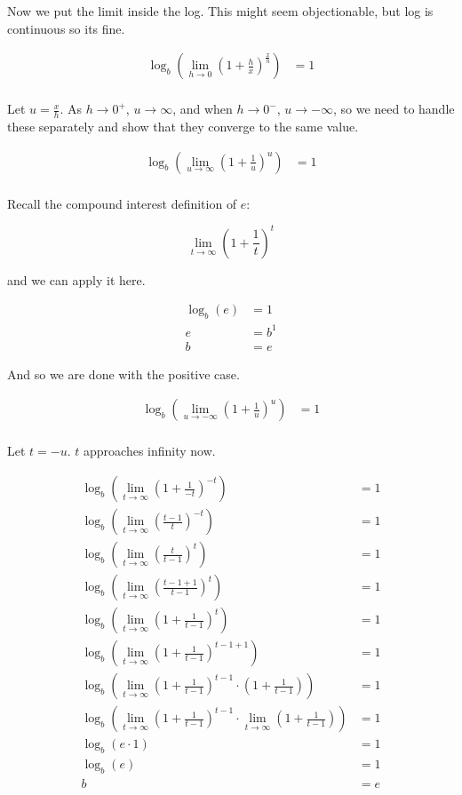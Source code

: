 Now we put the limit inside the log. This might seem objectionable, but log is continuous so its fine.

\begin{align}
\log_b({\lim_{h \to 0} (1 + \frac{h}{x})^{\frac{x}{h}}}) &= 1 \\
\end{align}

Let $u = \frac{x}{h}$. As $h \to 0^+$, $u \to \infty$, and when $h \to 0^-$, $u \to -\infty$, so we need to handle these separately and show that they converge to the same value.

\begin{align}
\log_b({\lim_{u \to \infty} (1 + \frac{1}{u})^{u}}) &= 1 \\
\end{align}

Recall the compound interest definition of $e$:

\[\lim_{t \to \infty} (1 + \frac{1}{t})^t\]

and we can apply it here.

\begin{align}
\log_b({e}) &= 1 \\
e &= b^1 \\
b &= e
\end{align}

And so we are done with the positive case.

\begin{align}
\log_b({\lim_{u \to -\infty} (1 + \frac{1}{u})^{u}}) &= 1 \\
\end{align}

Let $t = -u$. $t$ approaches infinity now.

\begin{align}
\log_b({\lim_{t \to \infty} (1 + \frac{1}{-t})^{-t}}) &= 1 \\
\log_b(\lim_{t \to \infty} (\frac{t-1}{t})^{-t}) &= 1\\
\log_b(\lim_{t \to \infty} (\frac{t}{t-1})^{t}) &= 1 \\
\log_b(\lim_{t \to \infty} (\frac{t - 1 + 1}{t-1})^{t}) &= 1 \\
\log_b(\lim_{t \to \infty} (1 + \frac{1}{t-1})^{t}) &= 1 \\
\log_b(\lim_{t \to \infty} (1 + \frac{1}{t-1})^{t - 1 + 1}) &= 1 \\
\log_b(\lim_{t \to \infty} (1 + \frac{1}{t-1})^{t - 1} \cdot (1 + \frac{1}{t-1})) &= 1 \\
\log_b(\lim_{t \to \infty} (1 + \frac{1}{t-1})^{t - 1} \cdot \lim_{t \to \infty} (1 + \frac{1}{t-1})) &= 1 \\
\log_b(e \cdot 1) &= 1 \\
\log_b(e) &= 1 \\
b &= e
\end{align}

